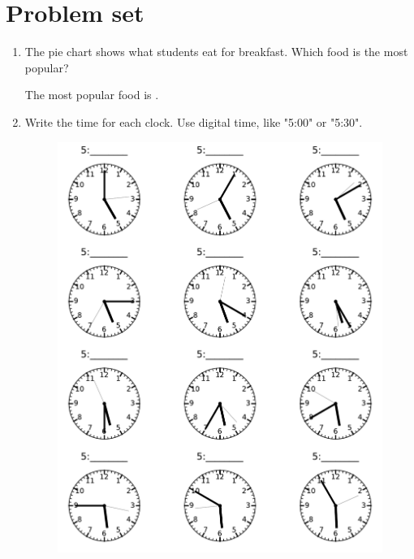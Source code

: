 \documentclass{tufte-book}
\begin{document}
\clearpage\section{Problem set }

\begin{enumerate}
\item {}
The pie chart shows what students eat for breakfast.
Which food is the most popular?\medskip

The most popular food is \dotfill\medskip.

 \item Write the time for each clock. Use digital time, like "5:00" or "5:30".\medskip

 \begin{figure}[h]\includegraphics[width=\textwidth]{fig/clock_grid_0500.pdf}\end{figure}


\end{enumerate}
\end{document}
